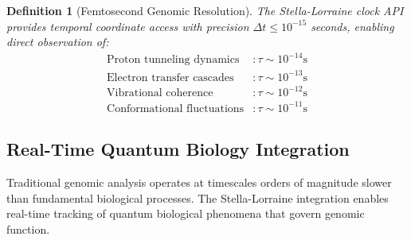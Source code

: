 \documentclass[12pt,a4paper]{article}
\newtheorem{definition}[theorem]{Definition}
\begin{document}
\begin{definition}[Femtosecond Genomic Resolution]
The Stella-Lorraine clock API provides temporal coordinate access with precision $\Delta t \leq 10^{-15}$ seconds, enabling direct observation of:
\begin{align}
\text{Proton tunneling dynamics} &: \tau \sim 10^{-14}\text{s} \\
\text{Electron transfer cascades} &: \tau \sim 10^{-13}\text{s} \\
\text{Vibrational coherence} &: \tau \sim 10^{-12}\text{s} \\
\text{Conformational fluctuations} &: \tau \sim 10^{-11}\text{s}
\end{align}
\end{definition}

\subsection{Real-Time Quantum Biology Integration}

Traditional genomic analysis operates at timescales orders of magnitude slower than fundamental biological processes. The Stella-Lorraine integration enables real-time tracking of quantum biological phenomena that govern genomic function.
\end{document}
